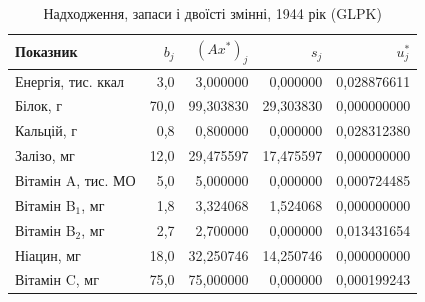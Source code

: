 \begin{table}[htbp]
\centering\small
\caption{Надходження, запаси і двоїсті змінні, 1944 рік (GLPK)}
\label{tab:glpk-dual-1944}
\begin{tabular}{lrrrr}
\toprule
Показник & $b_j$ & $(Ax^*)_j$ & $s_j$ & $u_j^*$ \\
\midrule
Енергія, тис. ккал & 3{,}0 & 3{,}000000 & 0{,}000000 & 0{,}028876611 \\
Білок, г & 70{,}0 & 99{,}303830 & 29{,}303830 & 0{,}000000000 \\
Кальцій, г & 0{,}8 & 0{,}800000 & 0{,}000000 & 0{,}028312380 \\
Залізо, мг & 12{,}0 & 29{,}475597 & 17{,}475597 & 0{,}000000000 \\
Вітамін A, тис. МО & 5{,}0 & 5{,}000000 & 0{,}000000 & 0{,}000724485 \\
Вітамін B$_1$, мг & 1{,}8 & 3{,}324068 & 1{,}524068 & 0{,}000000000 \\
Вітамін B$_2$, мг & 2{,}7 & 2{,}700000 & 0{,}000000 & 0{,}013431654 \\
Ніацин, мг & 18{,}0 & 32{,}250746 & 14{,}250746 & 0{,}000000000 \\
Вітамін C, мг & 75{,}0 & 75{,}000000 & 0{,}000000 & 0{,}000199243 \\
\bottomrule
\end{tabular}
\end{table}
